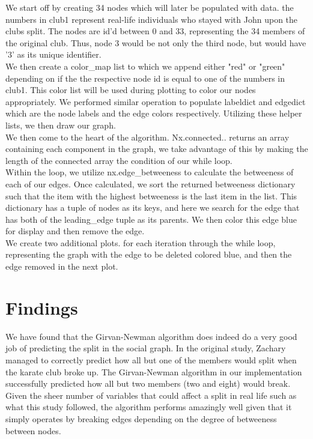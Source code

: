 \documentclass[11pt]{article}
\begin{document}
	\hspace{10mm} We start off by creating 34 nodes which will later be populated with data. the numbers in club1 represent real-life individuals who stayed with John upon the clubs split. The nodes are id'd between 0 and 33, representing the 34 members of the original club. Thus, node 3 would be not only the third node, but would have '3' as its unique identifier. \\ 
	\hspace{10mm}We then create a color\_map list to which we append either "red" or "green" depending on if the the respective node id is equal to one of the numbers in club1. This color list will be used during plotting to color our nodes appropriately. We performed similar operation to populate labeldict and edgedict which are the node labels and the edge colors respectively. Utilizing these helper lists, we then draw our graph. \\
	\hspace{10mm} We then come to the heart of the algorithm. Nx.connected.. returns an array containing each component in the graph, we take advantage of this by making the length of the connected array the condition of our while loop.  \\
	\hspace{10mm} Within the loop, we utilize nx.edge\_betweeness to calculate the betweeness of each of our edges. Once calculated, we sort the returned betweeness dictionary such that the item with the highest betweeness is the last item in the list. This dictionary has a tuple of nodes as its keys, and here we search for the edge that has both of the leading\_edge tuple as its parents. We then color this edge blue for display and then remove the edge.  \\
	\hspace{10mm} We create two additional plots. for each iteration through the while loop, representing the graph with the edge to be deleted colored blue, and then the edge removed in the next plot. \\
	
	\section{Findings}
	\hspace{10mm}  We have found that the Girvan-Newman algorithm does indeed do a very good job of predicting the split in the social graph. In the original study, Zachary managed to correctly predict how all but one of the members would split when the karate club broke up. The Girvan-Newman algorithm in our implementation successfully predicted how all but two members (two and eight) would break. Given the sheer number of variables that could affect a split in real life such as what this study followed, the algorithm performs amazingly well given that it simply operates by breaking edges depending on the degree of betweeness between nodes. 
\end{document}
